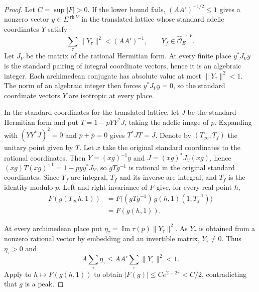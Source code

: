 \begin{proof}
Let $C=\sup|F|>0$. If the lower bound fails, $(AA')^{-1/2}\le1$ gives a nonzero vector $y\in E^{\operatorname{rk}V}$ in the translated lattice whose standard adelic coordinates $Y$ satisfy
\[
 \sum_\tau\|Y_\tau\|^2<(AA')^{-1},\qquad
         Y_f\in\widehat{\mathcal O}_E^{\operatorname{rk}V}.
\]
Let $J_V$ be the matrix of the rational Hermitian form. At every finite place $y^*J_Vy$ is the standard pairing of integral coordinate vectors, hence it is an algebraic integer. Each archimedean conjugate has absolute value at most $\|Y_\tau\|^2<1$. The norm of an algebraic integer then forces $y^*J_Vy=0$, so the standard coordinate vectors $Y$ are isotropic at every place.

In the standard coordinates for the translated lattice, let $J$ be the standard Hermitian form and put $T=1-pYY^*J$, taking the adelic image of $p$. Expanding with $(YY^*J)^2=0$ and $p+\bar p=0$ gives $T^*JT=J$. Denote by $(T_\infty,T_f)$ the unitary point given by $T$. Let $x$ take the original standard coordinates to the rational coordinates. Then $Y=(xg)^{-1}y$ and $J=(xg)^*J_V(xg)$, hence $(xg)T(xg)^{-1}=1-pyy^*J_V$, so $gTg^{-1}$ is rational in the original standard coordinates. Since $Y_f$ are integral, $T_f$ and its inverse are integral, and $T_f$ is the identity modulo $p$. Left and right invariance of $F$ give, for every real point $h$,
\[
 \begin{aligned}
 F(g(T_\infty h,1))
 &=F\bigl((gTg^{-1})\,g(h,1)(1,T_f^{-1})\bigr)\\
 &=F(g(h,1)).
 \end{aligned}
\]

At every archimedean place put $\eta_\tau=\operatorname{Im}\tau(p)\|Y_\tau\|^2$. As $Y_\tau$ is obtained from a nonzero rational vector by embedding and an invertible matrix, $Y_\tau\ne0$. Thus $\eta_\tau>0$ and
\[
       A\sum_\tau\eta_\tau
       \le AA'\sum_\tau\|Y_\tau\|^2<1 .
\]
Apply  to $h\mapsto F(g(h,1))$ to obtain $|F(g)|\le C e^{2-2\pi}<C/2$, contradicting that $g$ is a peak.
\end{proof}

